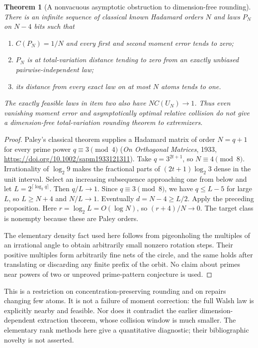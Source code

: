 \documentclass[11pt]{article}
\newtheorem{theorem}{Theorem}[section]
\begin{document}
\begin{theorem}[A nonvacuous asymptotic obstruction to dimension-free rounding]
\label{thm:rank-asymptotic}
There is an infinite sequence of classical known Hadamard orders $N$
and laws $P_N$ on $N-4$ bits such that
\begin{enumerate}
\item $C(P_N)=1/N$ and every first and second moment error tends to zero;
\item $P_N$ is at total-variation distance tending to zero from an
exactly unbiased pairwise-independent law;
\item its distance from every exact law on at most $N$ atoms tends to one.
\end{enumerate}
The exactly feasible laws in item two also have
$N C(U_N)\longrightarrow1$. Thus even vanishing moment error and
asymptotically optimal \emph{relative} collision do not give a
dimension-free total-variation rounding theorem to extremizers.
\end{theorem}
\begin{proof}
Paley's classical theorem supplies a Hadamard matrix of order
$N=q+1$ for every prime power $q\equiv3\pmod4$
(\emph{On Orthogonal Matrices}, 1933,
\url{https://doi.org/10.1002/sapm1933121311}).
Take $q=3^{2t+1}$, so $N\equiv4\pmod8$.
Irrationality of $\log_2 9$ makes the fractional parts of
$(2t+1)\log_2 3$ dense in the unit interval. Select an increasing
subsequence approaching one from below and let
$L=2^{\lceil\log_2 q\rceil}$. Then $q/L\to1$. Since $q\equiv3\pmod8$,
we have $q\le L-5$ for large $L$, so $L\ge N+4$ and $N/L\to1$.
Eventually $d=N-4\ge L/2$. Apply the preceding proposition.
Here $r=\log_2 L=O(\log N)$, so $(r+4)/N\to0$.
The target class is nonempty because these are Paley orders.

The elementary density fact used here follows from pigeonholing the
multiples of an irrational angle to obtain arbitrarily small nonzero
rotation steps. Their positive multiples form arbitrarily fine nets
of the circle, and the same holds after translating or discarding any
finite prefix of the orbit. No claim about primes near powers of two
or unproved prime-pattern conjecture is used.
\end{proof}

This is a restriction on concentration-preserving rounding and on
repairs changing few atoms. It is not a failure of moment correction:
the full Walsh law is explicitly nearby and feasible. Nor does it
contradict the earlier dimension-dependent extraction theorem, whose
collision window is much smaller. The elementary rank methods here
give a quantitative diagnostic; their bibliographic novelty is not
asserted.
\end{document}

